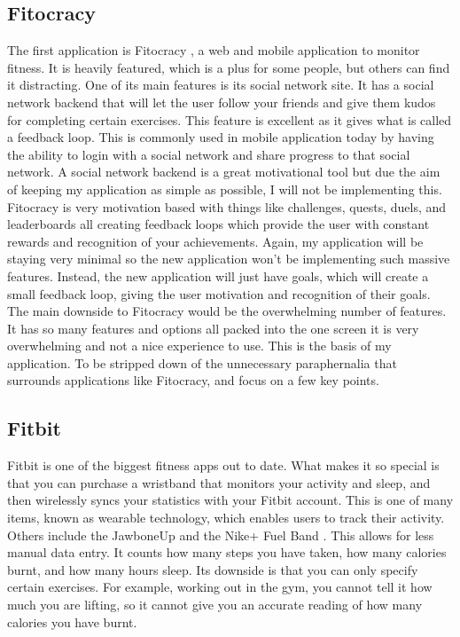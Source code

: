 \subsection{Fitocracy}
The first application is Fitocracy \citep{fitocracy:2007}, a web and mobile application to monitor fitness. It is heavily featured, which is a plus for some people, but others can find it distracting. One of its main features is its social network site. It has a social network backend that will let the user follow your friends and give them kudos for completing certain exercises. This feature is excellent as it gives what is called a feedback loop. This is commonly used in mobile application today by having the ability to login with a social network and share progress to that social network. A social network backend is a great motivational tool but due the aim of keeping my application as simple as possible, I will not be implementing this. Fitocracy is very motivation based with things like challenges, quests, duels, and leaderboards all creating feedback loops which provide the user with constant rewards and recognition of your achievements. Again, my application will be staying very minimal so the new application won't be implementing such massive features. Instead, the new application will just have goals, which will create a small feedback loop, giving the user motivation and recognition of their goals. The main downside to Fitocracy would be the overwhelming number of features. It has so many features and options all packed into the one screen it is very overwhelming and not a nice experience to use. This is the basis of my application. To be stripped down of the unnecessary paraphernalia that surrounds applications like Fitocracy, and focus on a few key points.


\subsection{Fitbit}
Fitbit is one of the biggest fitness apps out to date. What makes it so special is that you can purchase a wristband that monitors your activity and sleep, and then wirelessly syncs your statistics with your Fitbit account. This is one of many items, known as wearable technology, which enables users to track their activity. Others include the JawboneUp \citep{jawbone:2011} and the Nike+ Fuel Band \citep{nikefuelband:2012}. This allows for less manual data entry. It counts how many steps you have taken, how many calories burnt, and how many hours sleep. Its downside is that you can only specify certain exercises. For example, working out in the gym, you cannot tell it how much you are lifting, so it cannot give you an accurate reading of how many calories you have burnt.\\

